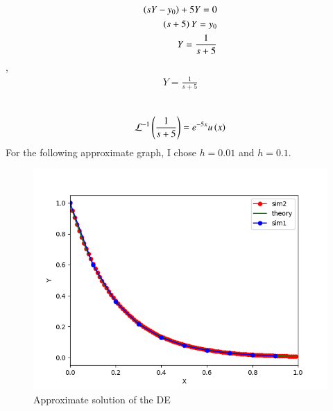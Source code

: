 \documentclass[journal]{IEEEtran}
\begin{document}
\begin{align}
    \left(sY - y_0\right) +5Y = 0\\
    \left(s + 5\right)Y = y_0\\
    Y = \frac{1}{s + 5}\\
\end{align}
    ,\\
\begin{align}
    Y = \frac{1}{s + 5}\\
\end{align}
    \\
\begin{align}
    \mathcal{L}^{-1}\left(\frac{1}{s+5}\right) = e^{-5x}u\left(x\right)
\end{align}
For the following approximate graph, I chose $h = 0.01$ and $h = 0.1$.
\begin{figure}[h!]
   \centering
   \includegraphics[width=0.7\columnwidth]{figs/fig.png}
    \caption{Approximate solution of the DE}
\end{figure}
\end{document}
